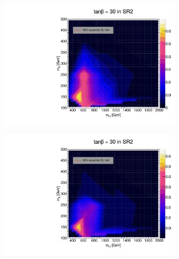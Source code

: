 \documentclass[12pt, a4paper]{book}
\begin{document}
\begin{figure}[!ht]
\begin{subfigure}[b]{0.49\textwidth}
   \end{subfigure}
   \hfill
   \begin{subfigure}[b]{0.49\textwidth}
      \centering
      \includegraphics[width=1\textwidth]{Limits/Model_independent/100-150/2HDM/2HDM_ee_tb30.pdf}
   \end{subfigure}
   \hfill
   \begin{subfigure}[b]{0.49\textwidth}
      \centering
      \includegraphics[width=1\textwidth]{Limits/Model_independent/100-150/2HDM/2HDM_uu_tb30.pdf}
   \end{subfigure}
   \hfill
	\begin{subfigure}[b]{0.49\textwidth}
      \centering

\end{subfigure}
\end{figure}
\end{document}
